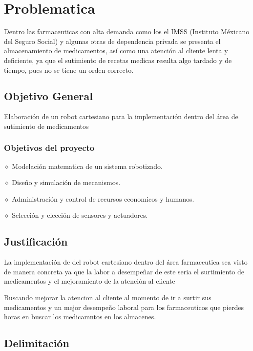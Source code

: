 \documentclass[letter,operight,12pt,spanish]{report}
\begin{document}
\maketitle

\section{Problematica}

Dentro las farmaceuticas con alta demanda como los el IMSS (Instituto M\'exicano del Seguro Social) y algunas otras de dependencia privada se presenta el almacenamiento de medicamentos, as\'i como una atenci\'on al cliente lenta y deficiente, ya que el sutimiento de recetas medicas resulta algo tardado y de tiempo, pues no se tiene un orden correcto.
\subsection{Objetivo General}

Elaboraci\'on de un robot cartesiano para la implementaci\'on dentro del \'area de sutimiento de medicamentos\\

\subsubsection{Objetivos del proyecto}

$\diamond$ Modelaci\'on matematica de un sistema robotizado.

$\diamond$ Diseño y simulaci\'on de mecanismos.

$\diamond$ Administraci\'on y control de recursos economicos y humanos.

$\diamond$ Selecci\'on y elecci\'on de sensores y actuadores.

\subsection{Justificaci\'on}

La implementaci\'on de del robot cartesiano dentro del \'area farmaceutica sea visto de manera concreta ya que la labor a desempeñar de este seria el surtimiento de medicamentos y el mejoramiento de la atenci\'on al cliente

Buscando mejorar la atencion al cliente al momento de ir a surtir sus medicamentos y un mejor desempeño laboral para los farmaceuticos que pierdes horas en buscar los medicamntos en los almacenes.

\subsection{Delimitaci\'on}
\end{document}
